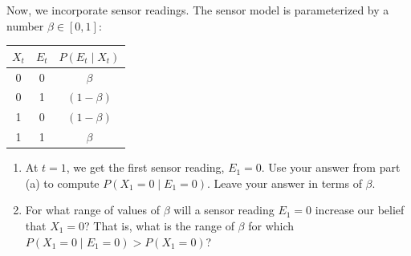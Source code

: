 \documentclass[a4paper]{article}
\newif\ifsol
\begin{document}
        Now, we incorporate sensor readings. The sensor model is parameterized by a number $\beta \in \left[0, 1\right]$:
    
        \begin{center}
        \large
        \begin{tabular}{|c|c|c|}
        \hline
        \normalsize $X_t$ & \normalsize $E_t$ & \normalsize $P(E_t \mid X_t)$ \\ \hline
        \normalsize 0 & \normalsize 0 & \normalsize $\beta$ \\ \hline
        \normalsize 0 & \normalsize 1 & \normalsize $(1-\beta)$ \\ \hline
        \normalsize 1 & \normalsize 0 & \normalsize $(1-\beta)$ \\ \hline
        \normalsize 1 & \normalsize 1 & \normalsize $\beta$ \\ \hline
        \end{tabular}
        \end{center}
        
        \begin{enumerate}{b)}
        \item \quad At $t=1$, we get the first sensor reading, $E_1 = 0$. Use your answer from part (a) to compute $P(X_1 = 0 \mid E_1 = 0)$. Leave your answer in terms of $\beta$. \\
        
        \ifsol {\color{blue}
        \begin{align*}
        p(X_1 = 0 | E_1 = 0) &= \frac{p(E_1 = 0 | X_1 = 0)p(X_1 = 0)}{\sum_x p(E_1 = 0 | X_1 = x)p(X_1 = x)} \\
        &= \frac{\beta(0.7)}{\beta(0.7) + (1-\beta)(0.3)} \\
        \end{align*}}
        \else
            \bigskip
            \bigskip
            \bigskip
            \bigskip
        \fi
        
        \item \quad For what range of values of $\beta$ will a sensor reading $E_1 = 0$ increase our belief that $X_1 = 0$? That is, what is the range of $\beta$ for which $P(X_1=0 \mid E_1=0) > P(X_1 = 0)$? \\
        
        \ifsol {\color{blue}
        $\beta \in \left(0.5, 1\right]$. Intuitively, observing $E_1 = 0$ will only increase the belief that $X_1 = 0$ if $E_1 = 0$ is more likely under $X_1 = 0$ than not. Note that $\beta > 0.5$; $\beta = 0.5$ is uninformative since the conditional distribution is uniform. This can be verified algebraically by setting $p(X_1 = 0) = p(X_1 = 0 | E_1 = 0)$ and solving for $\beta$.}
        \else
            \bigskip
            \bigskip
            \bigskip
            \bigskip
        \fi
    
    \end{enumerate}
\end{document}
